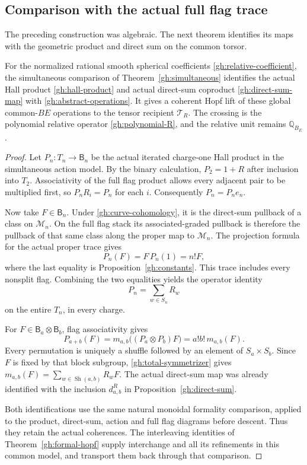 \subsection{Comparison with the actual full flag trace}

The preceding construction was algebraic. The next theorem identifies
its maps with the geometric product and direct sum on the common
torsor.

\begin{theorem}\label{gh:global-hopf}
For the normalized rational smooth spherical coefficients
\eqref{gh:relative-coefficient}, the simultaneous comparison of
Theorem~\ref{gh:simultaneous} identifies the actual Hall product
\eqref{gh:hall-product} and actual direct-sum coproduct
\eqref{gh:direct-sum-map} with \eqref{gh:abstract-operations}.
It gives a coherent Hopf lift of these global common-$BE$ operations
to the tensor recipient $\mathcal T_R$. The crossing is the
polynomial relative operator \eqref{gh:polynomial-R}, and the
relative unit remains $\mathbb Q_{B_E}$.
\end{theorem}
\begin{proof}
Let $P_n:T_n\to\mathsf B_n$ be the actual iterated charge-one
Hall product in the simultaneous action model. By the binary
calculation,
$P_2=1+R$ after inclusion into $T_2$.
Associativity of the full flag product allows every adjacent pair
to be multiplied first, so $P_nR_i=P_n$ for each $i$.
Consequently $P_n=P_ne_n$.

Now take $F\in\mathsf B_n$. Under
\eqref{gh:curve-cohomology}, it is the direct-sum pullback of a
class on $\mathcal M_n$. On the full flag stack its
associated-graded pullback is therefore the pullback of that
same class along the proper map to $\mathcal M_n$.
The projection formula for the actual proper trace gives
\[
 P_n(F)=F\,P_n(1)=n!F,
\]
where the last equality is Proposition~\ref{gh:constants}.
This trace includes every nonsplit flag. Combining the two
equalities yields the operator identity
\begin{equation}\label{gh:total-symmetrizer}
 P_n=\sum_{w\in S_n}R_w
\end{equation}
on the entire $T_n$, in every charge.

For $F\in\mathsf B_a\otimes\mathsf B_b$, flag associativity gives
\[
 P_{a+b}(F)
 =m_{a,b}\bigl((P_a\otimes P_b)F\bigr)
 =a!b!\,m_{a,b}(F).
\]
Every permutation is uniquely a shuffle followed by an element of
$S_a\times S_b$. Since $F$ is fixed by that block subgroup,
\eqref{gh:total-symmetrizer} gives
$m_{a,b}(F)=\sum_{w\in\operatorname{Sh}(a,b)}R_wF$.
The actual direct-sum map was already identified with the inclusion
$d^R_{a,b}$ in Proposition~\ref{gh:direct-sum}.

Both identifications use the same natural monoidal formality
comparison, applied to the product, direct-sum, action and full flag
diagrams before descent. Thus they retain the actual coherences.
The interleaving identities of Theorem~\ref{gh:formal-hopf} supply
interchange and all its refinements in this common model, and
transport them back through that comparison.
\end{proof}

